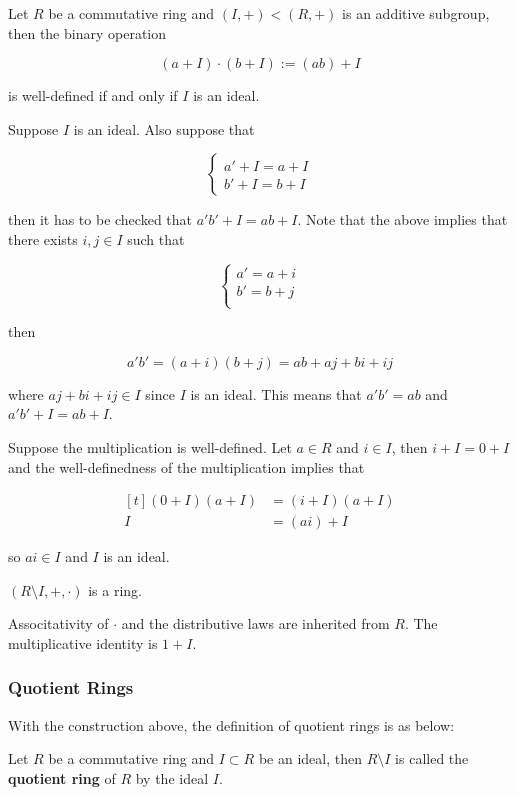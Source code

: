 \documentclass[a4paper,12pt]{article}
\begin{document}
\begin{thm}
  Let $R$ be a commutative ring and $(I,+)<(R,+)$ is an additive subgroup, then the binary operation

  $$(a+I)\cdot(b+I):=(ab)+I$$\s

  is well-defined if and only if $I$ is an ideal.\n

  \prf\arl Suppose $I$ is an ideal. Also suppose that

  $$\begin{cases}
    a'+I=a+I\\
    b'+I=b+I
  \end{cases}$$\s

  then it has to be checked that $a'b'+I=ab+I$. Note that the above implies that there exists $i,j\in I$ such that

  $$\begin{cases}
    a'=a+i\\
    b'=b+j\\
  \end{cases}$$\s

  then

  $$a'b'=(a+i)(b+j)=ab+aj+bi+ij$$\s

  where $aj+bi+ij\in I$ since $I$ is an ideal. This means that $a'b'=ab$ and $a'b'+I=ab+I$.\n

  \arr Suppose the multiplication is well-defined. Let $a\in R$ and $i\in I$, then $i+I=0+I$ and the well-definedness of the multiplication implies that

  $$\begin{aligned}[t]
    (0+I)(a+I)&=(i+I)(a+I)\\
    I&=(ai)+I
  \end{aligned}$$\s

  so $ai\in I$ and $I$ is an ideal.
\end{thm}\n

\begin{crl}
  $(R\setminus I,+,\cdot)$ is a ring.\n

  \prf Associtativity of $\cdot$ and the distributive laws are inherited from $R$. The multiplicative identity is $1+I$.
\end{crl}

\subsubsection{Quotient Rings}
With the construction above, the definition of quotient rings is as below:\n

\begin{dft}
  Let $R$ be a commutative ring and $I\subset R$ be an ideal, then $R\setminus I$ is called the \textbf{quotient ring} of $R$ by the ideal $I$.
\end{dft}\n
\end{document}
